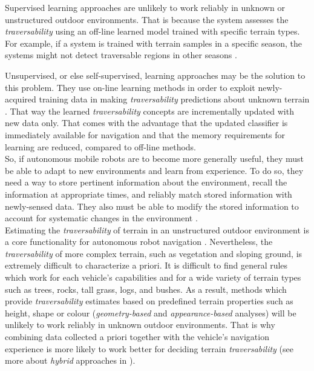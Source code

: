 \documentclass[12pt,a4paper]{report}
\newcommand{\term}{\textit}
\begin{document}
	Supervised learning approaches are unlikely to work reliably in unknown or 
	unstructured outdoor environments. That is because the system assesses the 
	\term{traversability} using an off-line learned model trained with specific 
	terrain types. For example, if a system is trained with terrain samples in a 
	specific season, the systems might not detect traversable regions in other 
	seasons \cite{Lee}.
	\par
	Unsupervised, or else self-supervised, learning approaches may be the solution 
	to this problem. They use on-line learning methods in order to exploit newly-
	acquired training data in making \term{traversability} predictions about unknown 
	terrain \cite{Kim}. That way the learned \term{traversability} concepts are 
	incrementally updated with new data only. That comes with the advantage that the 
	updated classifier is immediately available for navigation and that the memory 
	requirements for learning are reduced, compared to off-line methods.
	\\
	
	So, if autonomous mobile robots are to become more generally useful, they must 
	be able to adapt to new environments and learn from experience. To do so, they 
	need a way to store pertinent information about the environment, recall the 
	information at appropriate times, and reliably match stored information with 
	newly-sensed data. They also must be able to modify the stored information to 
	account for systematic changes in the environment \cite{Shneier}.
	\\
	
	Estimating the \term{traversability} of terrain in an unstructured outdoor 
	environment is a core functionality for autonomous robot navigation \cite{Kim}. 
	Nevertheless, the \term{traversability} of more complex terrain, such as 
	vegetation and sloping ground, is extremely difficult to characterize a priori. 
	It is difficult to find general rules which work for each vehicle's	capabilities
	and for a wide variety of terrain types such as trees, rocks, tall grass, logs, 
	and bushes. As a result, methods which provide \term{traversability} estimates 
	based on predefined terrain properties such as height, shape or colour 
	(\term{geometry-based} and \term{appearance-based} analyses) will be unlikely to 
	work reliably in unknown outdoor environments. That is why combining data 
	collected a priori together with the vehicle’s navigation experience is more 
	likely to work better for deciding terrain \term{traversability} (see more about 
	\term{hybrid} approaches in \cite{Papadakis}).
	\\
	
\end{document}
